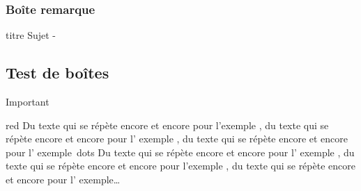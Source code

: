 \documentclass[b,e,cours]{D:/hubiC/GitHub/test_Baggio/paquets/classe_kara}
\begin{document}
\subsubsection{Boîte remarque}
\begin{frame}
\begin{remarque}{titre}
Sujet - \\
\end{remarque}
\end{frame}
\subsection{Test de boîtes}
\begin{frame}
\begin{bclogo}[logo=\bcinfo,barre=none,noborder=true]{Important}%
\begin{gbar}{red}
Du texte qui se répète encore et encore pour l’exemple , du
texte qui se répète encore et encore pour l’ exemple , du texte
qui se répète encore et encore pour l’ exemple\ dots Du texte
qui se répète encore et encore pour l’ exemple , du texte qui se
répète encore et encore pour l’exemple , du texte qui se
répète encore et encore pour l’ exemple\dots
\end{gbar}
\end{bclogo}
\end{frame}
\end{document}
